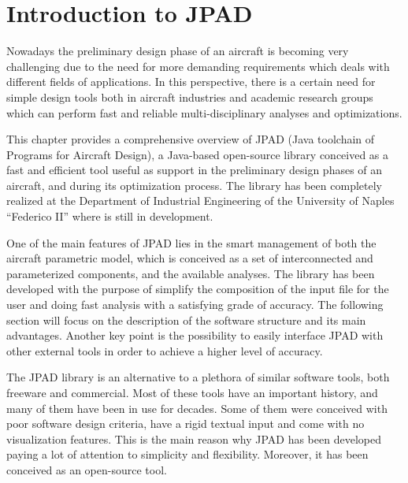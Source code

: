 
\chapter{Introduction to JPAD}
\label{ch1}

Nowadays the preliminary design phase of an aircraft is becoming very challenging due to the need for more demanding requirements which deals with different fields of applications. In this perspective, there is a certain need for simple design tools both in aircraft industries and academic research groups which can perform fast and reliable multi-disciplinary analyses and optimizations.

This chapter provides a comprehensive overview of JPAD (Java toolchain of Programs for Aircraft Design), a Java-based open-source library conceived as a fast and efficient tool useful as support in the preliminary design phases of an aircraft, and during its optimization process. The library has been completely realized at the Department of Industrial Engineering of the University of Naples “Federico II” where is still in development.

One of the main features of JPAD lies in the smart management of both the aircraft parametric model, which is conceived as a set of interconnected and parameterized components, and the available analyses. The library has been developed with the purpose of simplify the composition of the input file for the user and doing fast analysis with a satisfying grade of accuracy. The following section will focus on the description of the software structure and its main advantages. Another key point is the possibility to easily interface JPAD with other external tools in order to achieve a higher level of accuracy.

The JPAD library is an alternative to a plethora of similar software tools, both freeware and commercial. Most of these tools have an important history, and many of them have been in use for decades. Some of them were conceived with poor software design criteria, have a rigid textual input and come with no visualization features. This is the main reason why JPAD has been developed paying a lot of attention to simplicity and flexibility. Moreover, it has been conceived as an open-source tool.

